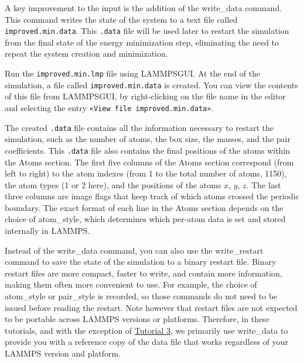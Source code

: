 \documentclass[9pt,tutorial]{livecoms}
\newcommand{\lmpcmd}[1]{\hspace{0pt}\colorbox{listing}{\textcolor{command}{\small{#1}}}\hspace{0pt}} %
\newcommand{\lmpcmdnote}[1]{\hspace{0pt}\colorbox{note_listing}{\textcolor{command}{\small{#1}}}\hspace{0pt}} %
\newcommand{\flecmd}[1]{\textcolor{command}{\texttt{#1}}} %
\newcommand{\guicmd}[1]{\textcolor{command}{\texttt{«#1»}}} %
\newcommand{\lammpsgui}{\textsf{LAMMPS\textendash GUI}}
\begin{document}
\begin{note}
  A key improvement to the input is the addition of the
  \lmpcmd{write\_data} command.  This command writes the state of the
  system to a text file called \flecmd{improved.min.data}.  This
  \flecmd{.data} file will be used later to restart the simulation from
  the final state of the energy minimization step, eliminating the need
  to repeat the system creation and minimization.
\end{note}

Run the \flecmd{improved.min.lmp} file using \lammpsgui{}.  At the end
of the simulation, a file called \flecmd{improved.min.data} is created.
You can view the contents of this file from \lammpsgui{}, by
right-clicking on the file name in the editor and selecting the entry
\guicmd{View file improved.min.data}.

The created \flecmd{.data} file contains all the information necessary
to restart the simulation, such as the number of atoms, the box size,
the masses, and the pair coefficients.  This \flecmd{.data} file also
contains the final positions of the atoms within the \lmpcmd{Atoms}
section.  The first five columns of the \lmpcmd{Atoms} section
correspond (from left to right) to the atom indexes (from 1 to the total
number of atoms, 1150), the atom types (1 or 2 here), and the positions
of the atoms $x$, $y$, $z$.  The last three columns are image flags that
keep track of which atoms crossed the periodic boundary.  The exact
format of each line in the \lmpcmd{Atoms} section depends on the choice
of \lmpcmd{atom\_style}, which determines which per-atom data is set and
stored internally in LAMMPS.

\begin{note}
Instead of the \lmpcmdnote{write\_data} command, you can also use the
\lmpcmdnote{write\_restart} command to save the state
of the simulation to a binary restart file.  Binary restart files are
more compact, faster to write, and contain more information, making them often
more convenient to use.  For example, the choice of \lmpcmdnote{atom\_style}
or \lmpcmdnote{pair\_style} is recorded, so those commands do not need to be issued
before reading the restart.  Note however that restart files are not expected to be
portable across LAMMPS versions or platforms.  Therefore, in these tutorials,
and with the exception of \hyperref[all-atom-label]{Tutorial 3}, we primarily use \lmpcmdnote{write\_data} to provide you with a reference
copy of the data file that works regardless of your LAMMPS version and platform.
\end{note}
\end{document}
